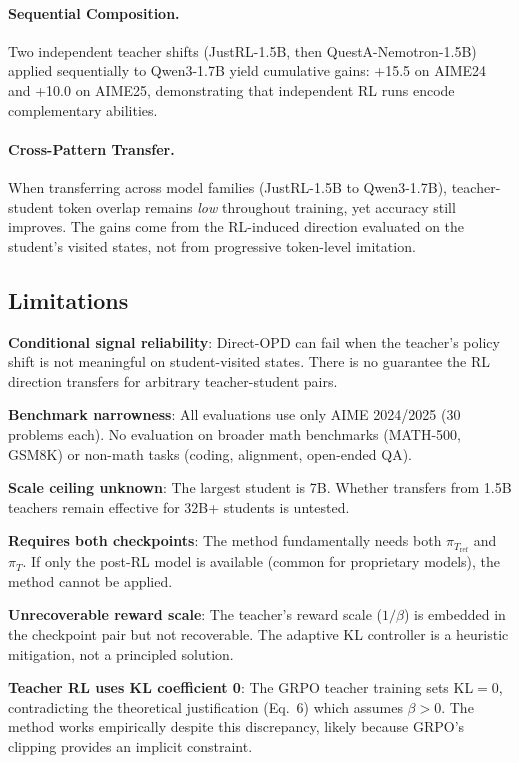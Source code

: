 \documentclass[11pt,a4paper]{article}
\begin{document}
\paragraph{Sequential Composition.} Two independent teacher shifts (JustRL-1.5B, then QuestA-Nemotron-1.5B) applied sequentially to Qwen3-1.7B yield cumulative gains: +15.5 on AIME24 and +10.0 on AIME25, demonstrating that independent RL runs encode complementary abilities.

\paragraph{Cross-Pattern Transfer.} When transferring across model families (JustRL-1.5B to Qwen3-1.7B), teacher-student token overlap remains \emph{low} throughout training, yet accuracy still improves. The gains come from the RL-induced direction evaluated on the student's visited states, not from progressive token-level imitation.

\subsection{Limitations}

\textbf{Conditional signal reliability}: Direct-OPD can fail when the teacher's policy shift is not meaningful on student-visited states. There is no guarantee the RL direction transfers for arbitrary teacher-student pairs.

\textbf{Benchmark narrowness}: All evaluations use only AIME 2024/2025 (30 problems each). No evaluation on broader math benchmarks (MATH-500, GSM8K) or non-math tasks (coding, alignment, open-ended QA).

\textbf{Scale ceiling unknown}: The largest student is 7B. Whether transfers from 1.5B teachers remain effective for 32B+ students is untested.

\textbf{Requires both checkpoints}: The method fundamentally needs both $\pi_{T_\mathrm{ref}}$ and $\pi_T$. If only the post-RL model is available (common for proprietary models), the method cannot be applied.

\textbf{Unrecoverable reward scale}: The teacher's reward scale ($1/\beta$) is embedded in the checkpoint pair but not recoverable. The adaptive KL controller is a heuristic mitigation, not a principled solution.

\textbf{Teacher RL uses KL coefficient 0}: The GRPO teacher training sets KL${}=0$, contradicting the theoretical justification (Eq.~6) which assumes $\beta > 0$. The method works empirically despite this discrepancy, likely because GRPO's clipping provides an implicit constraint.
\end{document}
